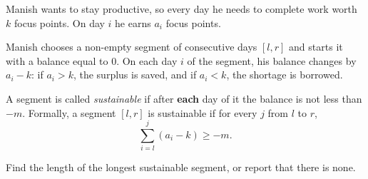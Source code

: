 Manish wants to stay productive, so every day he needs to complete work worth $k$ focus points. On day $i$ he earns $a_i$ focus points.

Manish chooses a non-empty segment of consecutive days $[l, r]$ and starts it with a balance equal to $0$. On each day $i$ of the segment, his balance changes by $a_i - k$: if $a_i > k$, the surplus is saved, and if $a_i < k$, the shortage is borrowed.

A segment is called \textit{sustainable} if after \textbf{each} day of it the balance is not less than $-m$. Formally, a segment $[l, r]$ is sustainable if for every $j$ from $l$ to $r$,
$$\sum_{i=l}^{j} (a_i - k) \ge -m.$$

Find the length of the longest sustainable segment, or report that there is none.